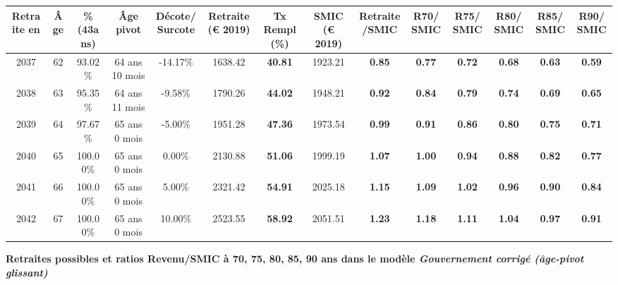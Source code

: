 \begin{adjustbox}{max width=\textwidth} 
\begin{tabular}[htb]{|c|c||c|c|c||c|c||c|c||c|c|c|c|c|} 
\hline 
 Retraite en &  Âge &  \%(43ans) &  Âge pivot &  Décote/Surcote &  Retraite (\euro{} 2019) &  Tx Rempl(\%) &  SMIC (\euro{} 2019) &  Retraite/SMIC &  R70/SMIC &  R75/SMIC &  R80/SMIC &  R85/SMIC &  R90/SMIC \\ 
\hline \hline 
 2037 &  62 &  93.02\% &  64 ans 10 mois &  -14.17\% &  1638.42 &  {\bf 40.81} &  1923.21 &  {\bf {\color{red} 0.85}} &  {\bf {\color{red} 0.77}} &  {\bf {\color{red} 0.72}} &  {\bf {\color{red} 0.68}} &  {\bf {\color{red} 0.63}} &  {\bf {\color{red} 0.59}} \\ 
\hline 
 2038 &  63 &  95.35\% &  64 ans 11 mois &  -9.58\% &  1790.26 &  {\bf 44.02} &  1948.21 &  {\bf {\color{red} 0.92}} &  {\bf {\color{red} 0.84}} &  {\bf {\color{red} 0.79}} &  {\bf {\color{red} 0.74}} &  {\bf {\color{red} 0.69}} &  {\bf {\color{red} 0.65}} \\ 
\hline 
 2039 &  64 &  97.67\% &  65 ans 0 mois &  -5.00\% &  1951.28 &  {\bf 47.36} &  1973.54 &  {\bf {\color{red} 0.99}} &  {\bf {\color{red} 0.91}} &  {\bf {\color{red} 0.86}} &  {\bf {\color{red} 0.80}} &  {\bf {\color{red} 0.75}} &  {\bf {\color{red} 0.71}} \\ 
\hline 
 2040 &  65 &  100.00\% &  65 ans 0 mois &  0.00\% &  2130.88 &  {\bf 51.06} &  1999.19 &  {\bf 1.07} &  {\bf {\color{red} 1.00}} &  {\bf {\color{red} 0.94}} &  {\bf {\color{red} 0.88}} &  {\bf {\color{red} 0.82}} &  {\bf {\color{red} 0.77}} \\ 
\hline 
 2041 &  66 &  100.00\% &  65 ans 0 mois &  5.00\% &  2321.42 &  {\bf 54.91} &  2025.18 &  {\bf 1.15} &  {\bf 1.09} &  {\bf 1.02} &  {\bf {\color{red} 0.96}} &  {\bf {\color{red} 0.90}} &  {\bf {\color{red} 0.84}} \\ 
\hline 
 2042 &  67 &  100.00\% &  65 ans 0 mois &  10.00\% &  2523.55 &  {\bf 58.92} &  2051.51 &  {\bf 1.23} &  {\bf 1.18} &  {\bf 1.11} &  {\bf 1.04} &  {\bf {\color{red} 0.97}} &  {\bf {\color{red} 0.91}} \\ 
\hline 
\hline 
\end{tabular} 
\end{adjustbox} 
 
 \vspace{0.1cm} 
{\bf \noindent Retraites possibles et ratios Revenu/SMIC à 70, 75, 80, 85, 90 ans dans le modèle \emph{Gouvernement corrigé (âge-pivot glissant)}}  
 
